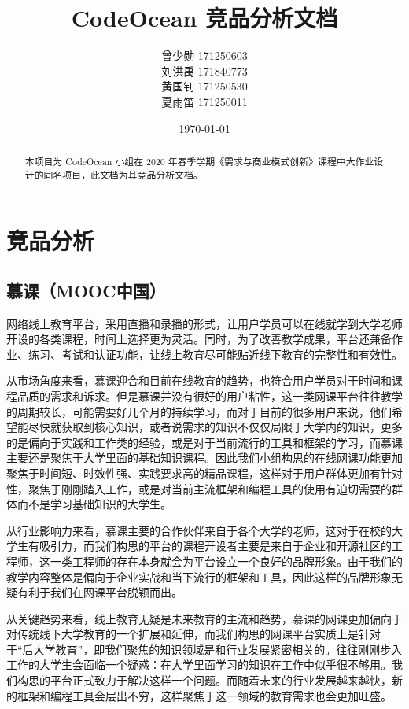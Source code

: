 \documentclass[a4paper]{ctexart}
\title{CodeOcean 竞品分析文档}
\author{
  曾少勋 171250603\\
  刘洪禹 171840773\\
  黄国钊 171250530\\
  夏雨笛 171250011\\
}
\date{\today}
\begin{document}
\maketitle

\begin{abstract}
  本项目为 CodeOcean 小组在 2020 年春季学期《需求与商业模式创新》课程中大作业设计的同名项目，此文档为其竞品分析文档。
\end{abstract}

\tableofcontents

\newpage

\setlength{\parskip}{1em}


\section{竞品分析}

\subsection{慕课（MOOC中国）}
网络线上教育平台，采用直播和录播的形式，让用户学员可以在线就学到大学老师开设的各类课程，时间上选择更为灵活。同时，为了改善教学成果，平台还兼备作业、练习、考试和认证功能，让线上教育尽可能贴近线下教育的完整性和有效性。 

从市场角度来看，慕课迎合和目前在线教育的趋势，也符合用户学员对于时间和课程品质的需求和诉求。但是慕课并没有很好的用户粘性，这一类网课平台往往教学的周期较长，可能需要好几个月的持续学习，而对于目前的很多用户来说，他们希望能尽快就获取到核心知识，或者说需求的知识不仅仅局限于大学内的知识，更多的是偏向于实践和工作类的经验，或是对于当前流行的工具和框架的学习，而慕课主要还是聚焦于大学里面的基础知识课程。因此我们小组构思的在线网课功能更加聚焦于时间短、时效性强、实践要求高的精品课程，这样对于用户群体更加有针对性，聚焦于刚刚踏入工作，或是对当前主流框架和编程工具的使用有迫切需要的群体而不是学习基础知识的大学生。 

从行业影响力来看，慕课主要的合作伙伴来自于各个大学的老师，这对于在校的大学生有吸引力，而我们构思的平台的课程开设者主要是来自于企业和开源社区的工程师，这一类工程师的存在本身就会为平台设立一个良好的品牌形象。由于我们的教学内容整体是偏向于企业实战和当下流行的框架和工具，因此这样的品牌形象无疑有利于我们在网课平台脱颖而出。 

从关键趋势来看，线上教育无疑是未来教育的主流和趋势，慕课的网课更加偏向于对传统线下大学教育的一个扩展和延伸，而我们构思的网课平台实质上是针对于“后大学教育”，即我们聚焦的知识领域是和行业发展紧密相关的。往往刚刚步入工作的大学生会面临一个疑惑：在大学里面学习的知识在工作中似乎很不够用。我们构思的平台正式致力于解决这样一个问题。而随着未来的行业发展越来越快，新的框架和编程工具会层出不穷，这样聚焦于这一领域的教育需求也会更加旺盛。
\end{document}
